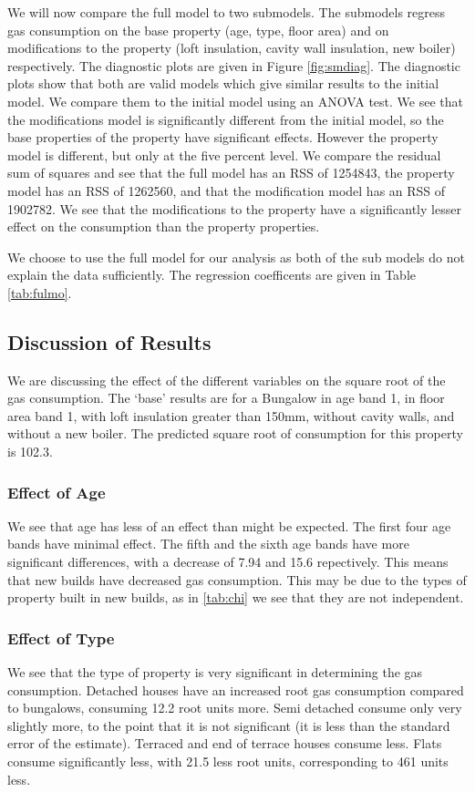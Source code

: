 \documentclass[9pt]{extarticle}
\begin{document}
We will now compare the full model to two submodels. The submodels regress gas consumption on the base property (age, type, floor area) and on modifications to the property (loft insulation, cavity wall insulation, new boiler) respectively. The diagnostic plots are given in Figure \ref{fig:smdiag}. The diagnostic plots show that both are valid models which give similar results to the initial model. We compare them to the initial model using an ANOVA test. We see that the modifications model is significantly different from the initial model, so the base properties of the property have significant effects. However the property model is different, but only at the five percent level. We compare the residual sum of squares and see that the full model has an RSS of 1254843, the property model has an RSS of 1262560, and that the modification model has an RSS of 1902782. We see that the modifications to the property have a significantly lesser effect on the consumption than the property properties.

We choose to use the full model for our analysis as both of the sub models do not explain the data sufficiently. The regression coefficents are given in Table \ref{tab:fulmo}.

\subsection{Discussion of Results}

We are discussing the effect of the different variables on the square root of the gas consumption. The `base' results are for a Bungalow in age band 1, in floor area band 1, with loft insulation greater than 150mm, without cavity walls, and without a new boiler. The predicted square root of consumption for this property is 102.3. 

\subsubsection{Effect of Age}
We see that age has less of an effect than might be expected. The first four age bands have minimal effect. The fifth and the sixth age bands have more significant differences, with a decrease of 7.94 and 15.6 repectively. This means that new builds have decreased gas consumption. This may be due to the types of property built in new builds, as in \ref{tab:chi} we see that they are not independent.

\subsubsection{Effect of Type}
We see that the type of property is very significant in determining the gas consumption. Detached houses have an increased root gas consumption compared to bungalows, consuming 12.2 root units more. Semi detached consume only very slightly more, to the point that it is not significant (it is less than the standard error of the estimate). Terraced and end of terrace houses consume less. Flats consume significantly less, with 21.5 less root units, corresponding to 461 units less. 
\end{document}
